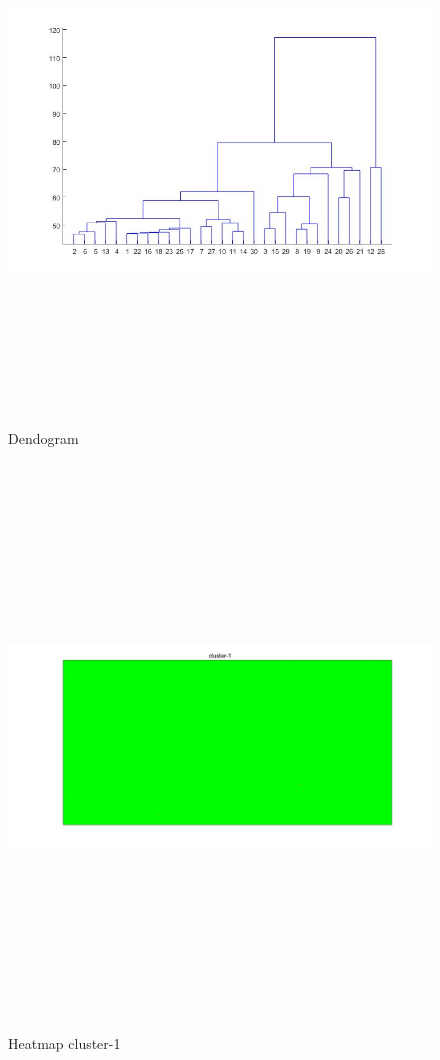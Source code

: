 \begin{figure}[htbp]
	\centering
	\includegraphics[width=\linewidth,height=15cm,keepaspectratio]{analisis/dendogram.jpg}
	\caption{Dendogram}
	\label{pic:dendo}
\end{figure}

\begin{figure}[htbp]
	\centering
	\includegraphics[width=\linewidth,height=15cm,keepaspectratio]{analisis/cluster-1.jpg}
	\caption{Heatmap cluster-1}
	\label{pic:cluster-1}
\end{figure}

